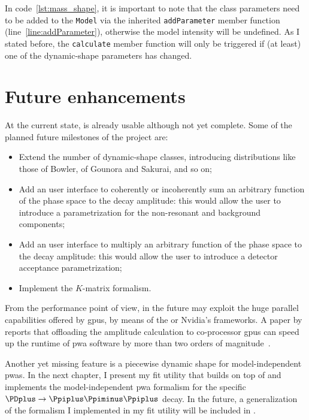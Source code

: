     
    In code~\ref{lst:mass_shape}, it is important to note that the class parameters need to be added to the \lstinline!Model! via the inherited \lstinline!addParameter! member function (line~\ref{line:addParameter}), otherwise the model intensity will be undefined.
    As I stated before, the \lstinline!calculate! member function will only be triggered if (at least) one of the dynamic-shape parameters has changed.


    \section{Future enhancements}

    At the current state,  is already usable although not yet complete.
    Some of the planned future milestones of the project are:
    \begin{itemize}
        \item
            Extend the number of dynamic-shape classes, introducing distributions like those of Bowler, of Gounora and Sakurai, and so on;

        \item
            Add an user interface to coherently or incoherently sum an arbitrary function of the phase space to the decay amplitude: this would allow the user to introduce a parametrization for the non-resonant and background components;

        \item
            Add an user interface to multiply an arbitrary function of the phase space to the decay amplitude: this would allow the user to introduce a detector acceptance parametrization;

        \item
            Implement the $K$-matrix formalism.

    \end{itemize}

    From the performance point of view, in the future  may exploit the huge parallel capabilities offered by \acsp{gpu}, by means of the  or Nvidia's  frameworks.
    A paper by \citeauthor{gpu_pwa_berger} reports that offloading the amplitude calculation to co-processor \acsp{gpu} can speed up the runtime of \ac{pwa} software by more than two orders of magnitude~\cite{gpu_pwa_berger}.


    Another yet missing feature is a piecewise dynamic shape for model-independent \acp{pwa}.
    In the next chapter, I present my fit utility that builds on top of  and implements the model-independent \ac{pwa} formalism for the specific $\PDplus\to\Ppiplus\Ppiminus\Ppiplus$ decay.
    In the future, a generalization of the formalism I implemented in my fit utility will be included in .
